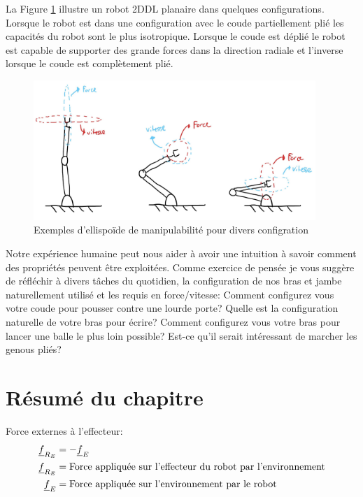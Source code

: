 \begin{example}

La Figure \ref{fig:manipulabilityellipsoidexemples} illustre un robot 2DDL planaire dans quelques configurations. Lorsque le robot est dans une configuration avec le coude partiellement plié les capacités du robot sont le plus isotropique. Lorsque le coude est déplié le robot est capable de supporter des grande forces dans la direction radiale et l'inverse lorsque le coude est complètement plié. 
\begin{figure}[H]
	\centering
		\includegraphics[width=0.95\textwidth]{fig/manipulabilityellipsoidexemples.jpg}
	\caption{Exemples d'ellispoïde de manipulabilité pour divers configration}
	\label{fig:manipulabilityellipsoidexemples}
\end{figure}
Notre expérience humaine peut nous aider à avoir une intuition à savoir comment des propriétés peuvent être exploitées. Comme exercice de pensée je vous suggère de réfléchir à divers tâches du quotidien, la configuration de nos bras et jambe naturellement utilisé et les requis en force/vitesse: Comment configurez vous votre coude pour pousser contre une lourde porte? Quelle est la configuration naturelle de votre bras pour écrire? Comment configurez vous votre bras pour lancer une balle le plus loin possible? Est-ce qu'il serait intéressant de marcher les genous pliés?
\end{example}


\newpage
\section{Résumé du chapitre}

Force externes à l'effecteur:
\begin{align}
\underline{f}_{R_E} &= - \underline{f}_E \\
\underline{f}_{R_E} &= \text{Force appliquée sur l'effecteur du robot par l'environnement} \\
\underline{f}_E &= \text{Force appliquée sur l'environnement par le robot}
\end{align}

